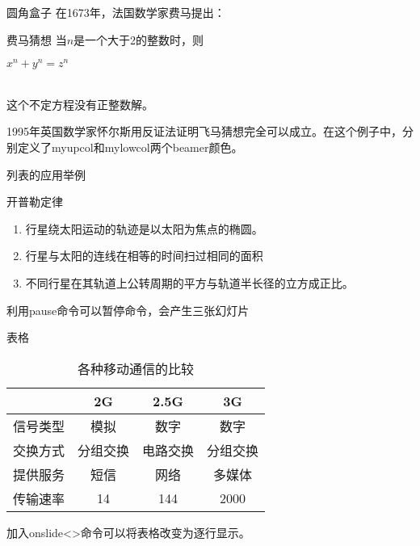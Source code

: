 \documentclass[14pt,hyperref={CJKbookmarks=true}]{beamer} %
\begin{document}
\begin{frame}{圆角盒子}
    在1673年，法国数学家费马提出：
    \begin{beamerboxesrounded}[upper=myupcol,lower=mylowcol,shadow=true]{费马猜想}
        当$ n $是一个大于2的整数时，则\\
        \centerline{$ x^{n}+y^{n}=z^{n} $}\\
        这个不定方程没有正整数解。\\
    \end{beamerboxesrounded}
    1995年英国数学家怀尔斯用反证法证明飞马猜想完全可以成立。在这个例子中，分别定义了myupcol和mylowcol两个beamer颜色。
\end{frame}
\begin{frame}{列表的应用举例}
    \begin{block}{开普勒定律}
        \begin{enumerate}
            \item  行星绕太阳运动的轨迹是以太阳为焦点的椭圆。
                  \pause
            \item  行星与太阳的连线在相等的时间扫过相同的面积
                  \pause
            \item  不同行星在其轨道上公转周期的平方与轨道半长径的立方成正比。
        \end{enumerate}
    \end{block}
    利用pause命令可以暂停命令，会产生三张幻灯片
\end{frame}
\begin{frame}{表格}
    \begin{table}
        \caption{各种移动通信的比较}
        \begin{tabular}{|c|c|c|c|}
            \hline
                 & 2G   & 2.5G & 3G   \\   \hline
            信号类型 & 模拟   & 数字   & 数字   \\  \hline {}
            交换方式 & 分组交换 & 电路交换 & 分组交换 \\  \hline  {}
            提供服务 & 短信   & 网络   & 多媒体  \\   \hline  {}
            传输速率 & 14   & 144  & 2000 \\     \hline
        \end{tabular}
    \end{table}
    加入onslide<>命令可以将表格改变为逐行显示。
\end{frame}
\end{document}
